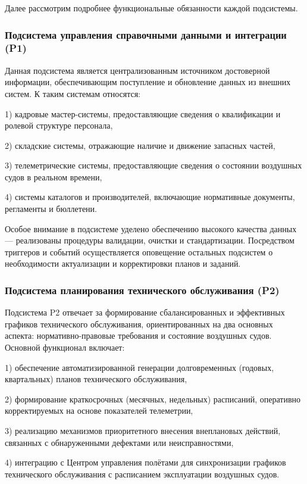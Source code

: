 \documentclass[14pt,a4paper]{extarticle}
\begin{document}
Далее рассмотрим подробнее функциональные обязанности каждой подсистемы.

\subsubsection{Подсистема управления справочными данными и интеграции (P1)}

Данная подсистема является централизованным источником достоверной информации, обеспечивающим поступление и обновление данных из внешних систем. К таким системам относятся: 

1) кадровые мастер-системы, предоставляющие сведения о квалификации и ролевой структуре персонала,

2) складские системы, отражающие наличие и движение запасных частей,

3) телеметрические системы, предоставляющие сведения о состоянии воздушных судов в реальном времени,

4) системы каталогов и производителей, включающие нормативные документы, регламенты и бюллетени.

Особое внимание в подсистеме уделено обеспечению высокого качества данных — реализованы процедуры валидации, очистки и стандартизации. Посредством триггеров и событий осуществляется оповещение остальных подсистем о необходимости актуализации и корректировки планов и заданий.

\subsubsection{Подсистема планирования технического обслуживания (P2)}

Подсистема P2 отвечает за формирование сбалансированных и эффективных графиков технического обслуживания, ориентированных на два основных аспекта: нормативно-правовые требования и состояние воздушных судов. Основной функционал включает: 

1) обеспечение автоматизированной генерации долговременных (годовых, квартальных) планов технического обслуживания,

2) формирование краткосрочных (месячных, недельных) расписаний, оперативно корректируемых на основе показателей телеметрии,

3) реализацию механизмов приоритетного внесения внеплановых действий, связанных с обнаруженными дефектами или неисправностями,

4) интеграцию с Центром управления полётами для синхронизации графиков технического обслуживания с расписанием эксплуатации воздушных судов.
\end{document}
